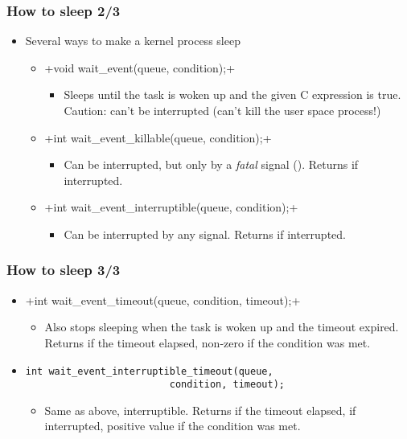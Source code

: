 \begin{frame}[fragile]
  \frametitle{How to sleep 2/3}
  \begin{itemize}
  \item Several ways to make a kernel process sleep
    \begin{itemize}
    \item {}+void wait_event(queue, condition);+
      \begin{itemize}
      \item Sleeps until the task is woken up and the given C
        expression is true. Caution: can't be interrupted (can't kill
        the user space process!)
      \end{itemize}
    \item {}+int wait_event_killable(queue, condition);+
      \begin{itemize}
      \item Can be interrupted, but only by a \emph{fatal} signal
        (). Returns \code{-} if interrupted.
      \end{itemize}
    \item {}+int wait_event_interruptible(queue, condition);+
      \begin{itemize}
      \item Can be interrupted by any signal. Returns
        \code{-} if interrupted.
      \end{itemize}
    \end{itemize}
  \end{itemize}
\end{frame}

\begin{frame}[fragile]
  \frametitle{How to sleep 3/3}
  \begin{itemize}
  \item {}+int wait_event_timeout(queue, condition, timeout);+
    \begin{itemize}
    \item Also stops sleeping when the task is woken up and the
      timeout expired. Returns  if the timeout elapsed, non-zero if
      the condition was met.
    \end{itemize}
  \item \begin{verbatim}
int wait_event_interruptible_timeout(queue,
                         condition, timeout);
  \end{verbatim}
    \begin{itemize}
    \item Same as above, interruptible. Returns  if the timeout
      elapsed, \code{-} if interrupted, positive value if
      the condition was met.
    \end{itemize}
  \end{itemize}
\end{frame}

